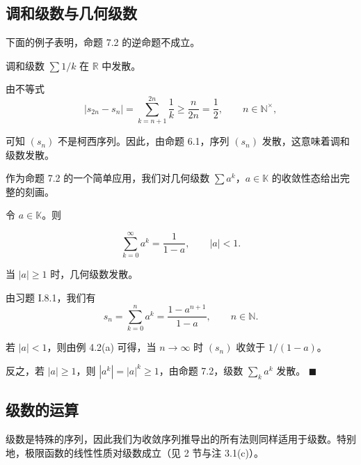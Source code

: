 \subsection*{调和级数与几何级数}

下面的例子表明，命题 7.2 的逆命题不成立。

\begin{example}

调和级数 $ \sum 1/k $ 在 $ \mathbb{R} $ 中发散。

\proofhead
由不等式
\[
|s_{2n}-s_{n}|=\sum_{k=n+1}^{2n}\frac{1}{k}\geq\frac{n}{2n}=\frac{1}{2},\qquad n\in\mathbb{N}^{\times},
\]

可知 $ (s_{n}) $ 不是柯西序列。因此，由命题 6.1，序列 $ (s_{n}) $ 发散，这意味着调和级数发散。

作为命题 7.2 的一个简单应用，我们对几何级数 $ \sum a^k $，$ a \in \mathbb{K} $ 的收敛性态给出完整的刻画。

\end{example}

\begin{example}

令 $ a \in \mathbb{K} $。则

\[
\sum_{k=0}^{\infty}a^{k}=\frac{1}{1-a},\qquad|a|<1.
\]

当 $ |a| \geq 1 $ 时，几何级数发散。

\proofhead
由习题 I.8.1，我们有
\[
s_{n}=\sum_{k=0}^{n}a^{k}=\frac{1-a^{n+1}}{1-a},\qquad n\in\mathbb{N}.
\]

若 $ |a| < 1 $，则由例 4.2(a) 可得，当 $ n \to \infty $ 时 $ (s_n) $ 收敛于 $ 1/(1-a) $。

反之，若 $ |a| \geq 1 $，则 $ |a^k| = |a|^k \geq 1 $，由命题 7.2，级数 $ \sum_k a^k $ 发散。 $ \blacksquare $

\end{example}

\subsection*{级数的运算}

级数是特殊的序列，因此我们为收敛序列推导出的所有法则同样适用于级数。特别地，极限函数的线性性质对级数成立（见 2 节与注 3.1(c)）。

